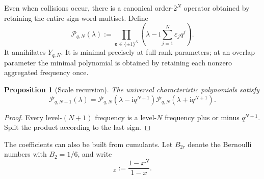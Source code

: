 \documentclass[11pt]{article}
\numberwithin{equation}{section}
\newtheorem{proposition}[theorem]{Proposition}
\theoremstyle{definition}
\theoremstyle{remark}
\newcommand{\ii}{\mathrm i}
\newcommand{\eps}{\varepsilon}
\begin{document}
Even when collisions occur, there is a canonical order-$2^N$ operator obtained
by retaining the entire sign-word multiset.  Define
\begin{equation}
 \mathscr P_{q,N}(\lambda):=
 \prod_{\bm\eps\in\{\pm1\}^N}
 \left(\lambda-\ii\sum_{j=1}^{N}\eps_jq^j\right).
 \label{eq:universal-characteristic}
\end{equation}
It annihilates $Y_{q,N}$.  It is minimal precisely at full-rank parameters; at
an overlap parameter the minimal polynomial is obtained by retaining each
nonzero aggregated frequency once.

\begin{proposition}[Scale recursion]
\label{prop:universal-recursion}
The universal characteristic polynomials satisfy
\begin{equation}
 \boxed{
 \mathscr P_{q,N+1}(\lambda)=
 \mathscr P_{q,N}(\lambda-\ii q^{N+1})
 \mathscr P_{q,N}(\lambda+\ii q^{N+1}).}
 \label{eq:universal-recursion}
\end{equation}
\end{proposition}
\begin{proof}
Every level-$(N+1)$ frequency is a level-$N$ frequency plus or minus
$q^{N+1}$.  Split the product according to the last sign.
\end{proof}

The coefficients can also be built from cumulants.  Let $B_{2r}$ denote the
Bernoulli numbers with $B_2=1/6$, and write
\begin{equation}
 [N]_x:=\frac{1-x^N}{1-x}.
 \label{eq:q-integer}
\end{equation}
\end{document}
